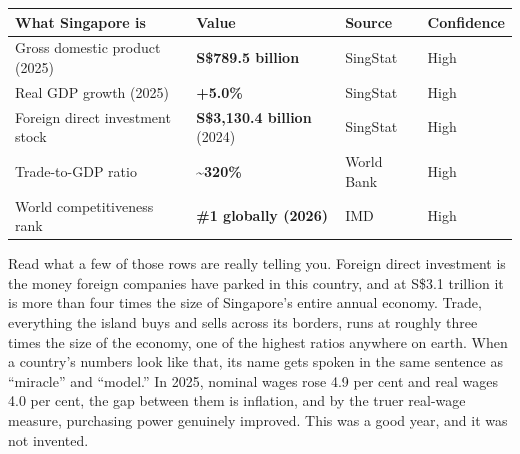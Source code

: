 \documentclass[10pt,twoside,openany]{memoir}
\renewcommand{\arraystretch}{1.1}
\begin{document}
{\def\LTcaptype{none} %
{\renewcommand{\arraystretch}{0.9}\begin{longtable}[]{@{}
  >{\raggedright\arraybackslash}p{}
  >{\raggedright\arraybackslash}p{}
  >{\raggedright\arraybackslash}p{}
  >{\raggedright\arraybackslash}p{}@{}}
\toprule\noalign{}
\begin{minipage}[b]{\linewidth}\raggedright
What Singapore is
\end{minipage} & \begin{minipage}[b]{\linewidth}\raggedright
Value
\end{minipage} & \begin{minipage}[b]{\linewidth}\raggedright
Source
\end{minipage} & \begin{minipage}[b]{\linewidth}\raggedright
Confidence
\end{minipage} \\
\midrule\noalign{}
\endhead
\bottomrule\noalign{}
\endlastfoot
Gross domestic product (2025) & \textbf{S\$789.5 billion} & SingStat &
High \\
Real GDP growth (2025) & \textbf{+5.0\%} & SingStat & High \\
Foreign direct investment stock & \textbf{S\$3,130.4 billion} (2024) &
SingStat & High \\
Trade-to-GDP ratio & \textbf{\textasciitilde320\%} & World Bank &
High \\
World competitiveness rank & \textbf{\#1 globally (2026)} & IMD &
High \\
\end{longtable}
}

Read what a few of those rows are really telling you. Foreign direct
investment is the money foreign companies have parked in this country,
and at S\$3.1 trillion it is more than four times the size of
Singapore's entire annual economy. Trade, everything the island buys and
sells across its borders, runs at roughly three times the size of the
economy, one of the highest ratios anywhere on earth. When a country's
numbers look like that, its name gets spoken in the same sentence as
``miracle'' and ``model.'' In 2025, nominal wages rose 4.9 per cent and
real wages 4.0 per cent, the gap between them is inflation, and by the
truer real-wage measure, purchasing power genuinely improved. This was a
good year, and it was not invented.

}
\end{document}
